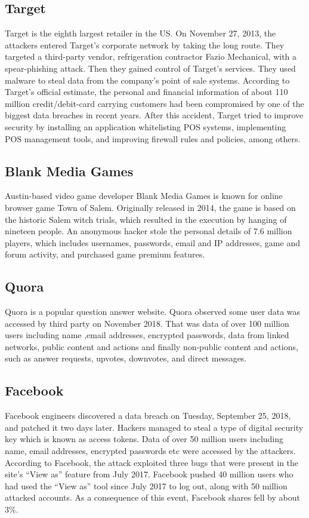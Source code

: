 \documentclass[12pt,a4paper,conference]{IEEEtran}
\begin{document}
\subsection{Target} 
Target is the eighth largest retailer in the US. On November 27, 2013, the attackers entered Target’s corporate network by taking the long route. They targeted a third-party vendor, refrigeration contractor Fazio Mechanical, with a spear-phishing attack. Then they gained control of Target’s services. They used malware to steal data from the company’s point of sale systems. According to Target’s official estimate, the personal and financial information of about 110 million credit/debit-card carrying customers had been compromised by one of the biggest data breaches in recent years. After this accident, Target tried to improve security by installing an application whitelisting POS systems, implementing POS management tools, and improving firewall rules and policies, among others.


\subsection{Blank Media Games}
Austin-based video game developer Blank Media Games is known for online browser game Town of Salem. Originally released in 2014, the game is based on the historic Salem witch trials, which resulted in the execution by hanging of nineteen people. An anonymous hacker stole the personal details of 7.6 million players, which includes usernames, passwords, email and IP addresses, game and forum activity, and purchased game premium features.

\subsection{Quora}
Quora is a popular question answer website. Quora observed some user data was accessed by third party on November 2018. That was data of over 100 million users including name ,email addresses, encrypted passwords, data from linked networks, public content and actions and finally  non-public content and actions, such as answer requests, upvotes, downvotes, and direct messages.

\subsection{Facebook}
Facebook engineers discovered a data breach on Tuesday, September 25, 2018, and patched it two days later.  Hackers managed to steal a type of digital security key which is known as access tokens. Data of over 50 million users including name, email addresses, encrypted passwords etc were accessed by the attackers. According to Facebook, the attack exploited three bugs that were present in the site’s “View as” feature from July 2017.  Facebook pushed 40 million users who had used the “View as” tool since July 2017 to log out, along with 50 million attacked accounts. As a consequence of this event, Facebook shares fell by about 3\%.
\end{document}
